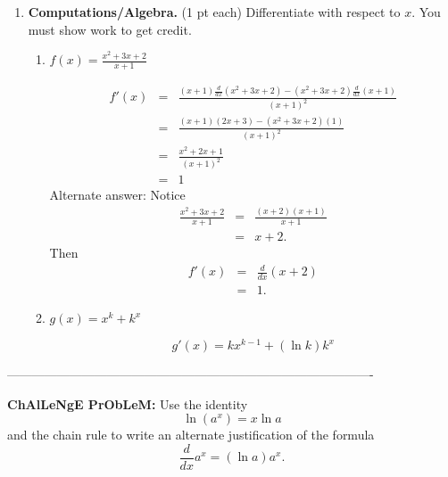 \documentclass[11pt,letterpaper]{article}
\begin{document}
\begin{enumerate}
\vspace{1pc}
\item \textbf{Computations/Algebra.} (1 pt each) Differentiate with respect to
$x$.  You must show work to get credit.
\begin{enumerate}
\item $f(x)=\frac{x^2 +3x+2}{x+1}$

\begin{eqnarray*}
 f'(x) &=& \frac{(x+1)\frac{d}{dx}(x^2+3x+2)-(x^2+3x+2)\frac{d}{dx}(x+1)}{(x+1)^2} \\
&=& \frac{(x+1)(2x+3)-(x^2+3x+2)(1)}{(x+1)^2} \\
&=& \frac{x^2+2x+1}{(x+1)^2} \\
&=& 1
\end{eqnarray*}
Alternate answer:  Notice
\begin{eqnarray*}
\frac{x^2+3x+2}{x+1} &=& \frac{(x+2)(x+1)}{x+1} \\
&=& x+2. 
\end{eqnarray*}
Then 
\begin{eqnarray*}
 f'(x) &=& \frac{d}{dx}(x+2) \\
&=& 1.
\end{eqnarray*}

\vspace{.5pc}
\item $g(x)=x^k +k^x$

\[g'(x)=kx^{k-1}+(\ln{k})k^x\]
\end{enumerate}

\end{enumerate}

\vspace{1pc}
----------------------------------------------------------------------------------------

\vspace{1pc}
\noindent \textbf{ChAlLeNgE PrObLeM:}  Use the identity 
\[\ln{(a^x)}=x\ln{a}\]
and the chain rule to write an alternate justification of the formula 
\[\frac{d}{dx}a^x=(\ln{a})a^x.\]
\end{document}
